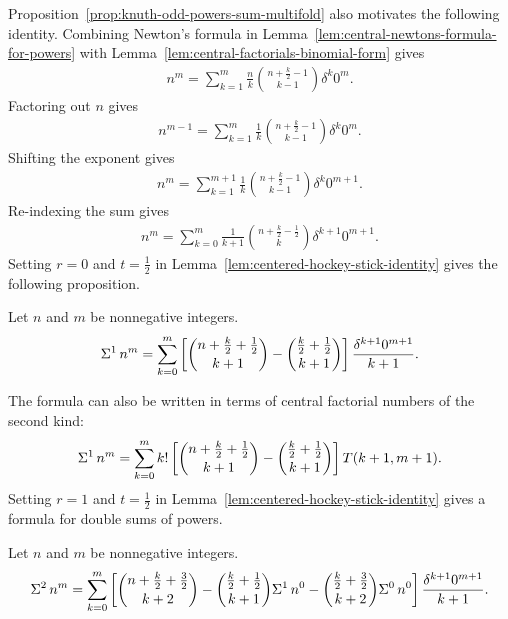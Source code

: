 Proposition~\eqref{prop:knuth-odd-powers-sum-multifold} also motivates the following identity.
Combining Newton's formula in Lemma~\eqref{lem:central-newtons-formula-for-powers} with Lemma~\eqref{lem:central-factorials-binomial-form} gives
\begin{align*}
  n^m = \sum_{k=1}^{m} \frac{n}{k} \binom{n+\frac{k}{2}-1}{k-1} \delta^{k} 0^m.
\end{align*}
Factoring out $n$ gives
\begin{align*}
  n^{m-1} = \sum_{k=1}^{m} \frac{1}{k} \binom{n+\frac{k}{2}-1}{k-1} \delta^{k} 0^m.
\end{align*}
Shifting the exponent gives
\begin{align*}
  n^{m} = \sum_{k=1}^{m+1} \frac{1}{k} \binom{n+\frac{k}{2}-1}{k-1} \delta^{k} 0^{m+1}.
\end{align*}
Re-indexing the sum gives
\begin{align}
  \label{eq:power-identity-at-zero}
  n^{m} = \sum_{k=0}^{m} \frac{1}{k+1} \binom{n+\frac{k}{2}-\frac{1}{2}}{k} \delta^{k+1} 0^{m+1}.
\end{align}
Setting $r=0$ and $t=\frac{1}{2}$ in Lemma~\eqref{lem:centered-hockey-stick-identity} gives the following proposition.
\begin{proposition}
  \label{prop:ordinary-sums-of-powers-at-zero}
  Let $n$ and $m$ be nonnegative integers.
  \begin{align*}
    \Sigma^{1}\,{n}^{m}
    = \sum_{k=0}^{m}
    \left[ \binom{n+\frac{k}{2}+\frac{1}{2}}{k+1} - \binom{\frac{k}{2}+\frac{1}{2}}{k+1}\right]
    \frac{\delta^{k+1} 0^{m+1}}{k+1}.
  \end{align*}
\end{proposition}
The formula can also be written in terms of central factorial numbers of the second kind:
\begin{align*}
  \Sigma^{1}\,{n}^{m}
  = \sum_{k=0}^{m} k!
  \left[ \binom{n+\frac{k}{2}+\frac{1}{2}}{k+1} - \binom{\frac{k}{2}+\frac{1}{2}}{k+1}\right]
  T(k+1, m+1).
\end{align*}
Setting $r=1$ and $t=\frac{1}{2}$ in Lemma~\eqref{lem:centered-hockey-stick-identity} gives a formula for double sums of powers.
\begin{proposition}
  \label{prop:double-sums-of-powers-at-zero}
  Let $n$ and $m$ be nonnegative integers.
  \begin{align*}
    \Sigma^{2}\,{n}^{m}
    = \sum_{k=0}^{m}
    \left[
      \binom{n+\frac{k}{2}+\frac{3}{2}}{k+2}
      - \binom{\frac{k}{2}+\frac{1}{2}}{k+1} \Sigma^{1}\,{n}^{0}
      - \binom{\frac{k}{2}+\frac{3}{2}}{k+2} \Sigma^{0}\,{n}^{0}
    \right]
    \frac{\delta^{k+1} 0^{m+1}}{k+1}.
  \end{align*}
\end{proposition}
